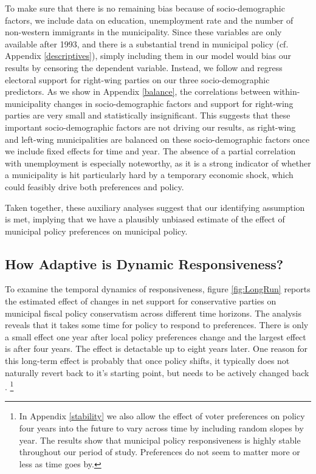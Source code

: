 \documentclass[a4paper,12pt]{article}
\begin{document}
To make sure that there is no remaining bias because of socio-demographic factors, we include data on education, unemployment rate and the number of non-western immigrants in the municipality. Since these variables are only available after 1993, and there is a substantial trend in municipal policy (cf. Appendix \ref{descriptives}), simply including them in our model would bias our results by censoring the dependent variable. Instead, we follow \citep{pei2018poorly} and regress electoral support for right-wing parties on our three socio-demographic predictors. As we show in Appendix \ref{balance}, the correlations between within-municipality changes in socio-demographic factors and support for right-wing parties are very small and statistically insignificant. This suggests that these important socio-demographic factors are not driving our results, as right-wing and left-wing municipalities are balanced on these socio-demographic factors once we include fixed effects for time and year. The absence of a partial correlation with unemployment is especially noteworthy, as it is a strong indicator of whether a municipality is hit particularly hard by a temporary economic shock, which could feasibly drive both preferences and policy.

Taken together, these auxiliary analyses suggest that our identifying assumption is met, implying that we have a plausibly unbiased estimate of the effect of municipal policy preferences on municipal policy.

\subsection*{How Adaptive is Dynamic Responsiveness?}

To examine the temporal dynamics of responsiveness, figure \ref{fig:LongRun} reports the estimated effect of changes in net support for conservative parties on municipal fiscal policy conservatism across different time horizons. The analysis reveals that it takes some time for policy to respond to preferences. There is only a small effect one year after local policy preferences change and the largest effect is after four years. The effect is detactable up to eight years later. One reason for this long-term effect is probably that once policy shifts, it typically does not naturally revert back to it's starting point, but needs to be actively changed back \citep[e.g.,][]{baumgartner2009punctuated}.
\footnote{In Appendix \ref{stability} we also allow the effect of voter preferences on policy four years into the future to vary across time by including random slopes by year. The results show that municipal policy responsiveness is highly stable throughout our period of study. Preferences do not seem to matter more or less as time goes by.}
\end{document}
